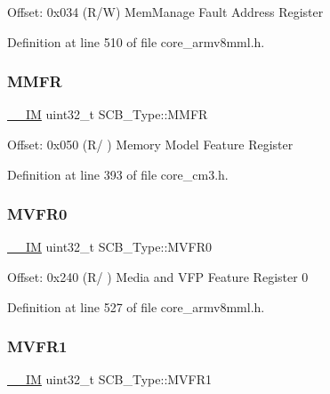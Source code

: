 Offset\+: 0x034 (R/W) Mem\+Manage Fault Address Register 

Definition at line 510 of file core\+\_\+armv8mml.\+h.

\mbox{\label{struct_s_c_b___type_a4f353f207bb27a1cea7861aa9eb00dbb}} 
\subsubsection{\texorpdfstring{M\+M\+FR}{MMFR}}
{\footnotesize\ttfamily \hyperlink{core__sc300_8h_a4cc1649793116d7c2d8afce7a4ffce43}{\+\_\+\+\_\+\+IM} uint32\+\_\+t S\+C\+B\+\_\+\+Type\+::\+M\+M\+FR}

Offset\+: 0x050 (R/ ) Memory Model Feature Register 

Definition at line 393 of file core\+\_\+cm3.\+h.

\mbox{\label{struct_s_c_b___type_a7a1ba0f875c0e97c1673882b1106e66b}} 
\subsubsection{\texorpdfstring{M\+V\+F\+R0}{MVFR0}}
{\footnotesize\ttfamily \hyperlink{core__sc300_8h_a4cc1649793116d7c2d8afce7a4ffce43}{\+\_\+\+\_\+\+IM} uint32\+\_\+t S\+C\+B\+\_\+\+Type\+::\+M\+V\+F\+R0}

Offset\+: 0x240 (R/ ) Media and V\+FP Feature Register 0 

Definition at line 527 of file core\+\_\+armv8mml.\+h.

\mbox{\label{struct_s_c_b___type_a75d6299150fdcbbcb765e22ff27c432e}} 
\subsubsection{\texorpdfstring{M\+V\+F\+R1}{MVFR1}}
{\footnotesize\ttfamily \hyperlink{core__sc300_8h_a4cc1649793116d7c2d8afce7a4ffce43}{\+\_\+\+\_\+\+IM} uint32\+\_\+t S\+C\+B\+\_\+\+Type\+::\+M\+V\+F\+R1}

